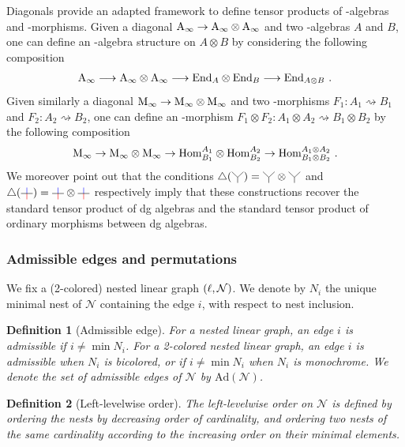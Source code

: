 \documentclass[twoside, 12pt]{amsart}
\newtheorem{definition}{Definition}[section]
\theoremstyle{remark}
\begin{document}
Diagonals provide an adapted framework to define tensor products of \Ainf -algebras and \Ainf -morphisms.
Given a diagonal $\mathrm{A}_\infty \to \mathrm{A}_\infty \otimes \mathrm{A}_\infty$ and two \Ainf -algebras $A$ and $B$, one can define an \Ainf -algebra structure on $A \otimes B$ by considering the following composition
\[ \mathrm{A}_\infty \longrightarrow \mathrm{A}_\infty \otimes \mathrm{A}_\infty \longrightarrow \mathrm{End}_A \otimes \mathrm{End}_B \longrightarrow \mathrm{End}_{A \otimes B} \ . \]
Given similarly a diagonal $\mathrm{M}_\infty \to \mathrm{M}_\infty \otimes \mathrm{M}_\infty$ and two \Ainf -morphisms $F_1 : A_1 \rightsquigarrow B_1$ and $F_2 : A_2 \rightsquigarrow B_2$, one can define an \Ainf -morphism $F_1 \otimes F_2 : A_1 \otimes A_2 \rightsquigarrow B_1 \otimes B_2$ by the following composition
\[ \Minf \rightarrow \Minf \otimes \Minf \rightarrow \Hom^{A_1}_{B_1} \otimes \Hom^{A_2}_{B_2} \rightarrow  \Hom^{A_1 \otimes A_2}_{B_1 \otimes B_2} \ . \]
We moreover point out that the conditions $\triangle (\arbreopdeux) = \arbreopdeux \otimes \arbreopdeux$ and $\triangle ( \arbreopunmorph ) = \arbreopunmorph \otimes \arbreopunmorph$ respectively imply that these constructions recover the standard tensor product of dg algebras and the standard tensor product of ordinary morphisms between dg algebras.

\subsubsection{Admissible edges and permutations}

We fix a (2-colored) nested linear graph $(\ell,\mathcal{N})$.
We denote by $N_i$ the unique minimal nest of $\mathcal{N}$ containing the edge $i$, with respect to nest inclusion. 

\begin{definition}[Admissible edge]
For a nested linear graph, an edge $i$ is \emph{admissible} if $i \neq \min N_i$. 
For a 2-colored nested linear graph, an edge $i$ is \emph{admissible} when $N_i$ is bicolored, or if $i \neq \min N_i$ when $N_i$ is monochrome.
We denote the set of admissible edges of $\mathcal{N}$ by $\mathrm{Ad}(\mathcal{N})$. 
\end{definition}

\begin{definition} [Left-levelwise order]
\label{def:left-levelwise-graph}
The \emph{left-levelwise order} on $\mathcal{N}$ is defined by ordering the nests by decreasing order of cardinality, and ordering two nests of the same cardinality according to the increasing order on their minimal elements. 
\end{definition}
\end{document}
